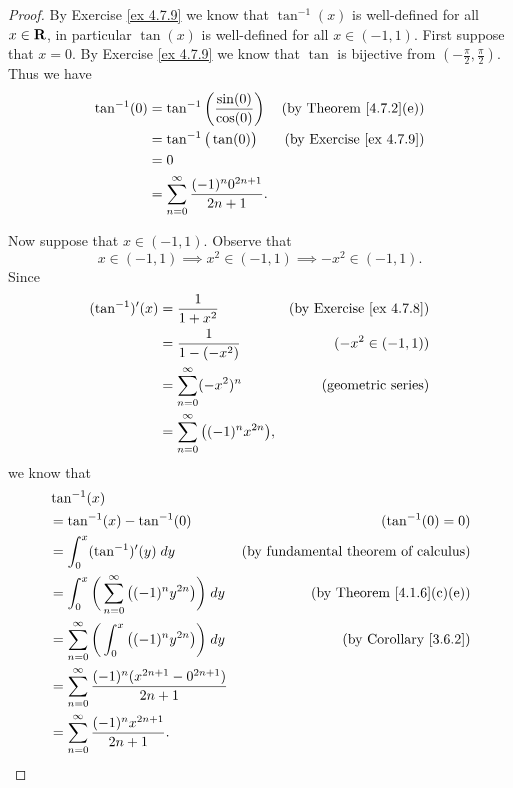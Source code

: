 \begin{proof}
    By Exercise \ref{ex 4.7.9} we know that \(\tan^{-1}(x)\) is well-defined for all \(x \in \mathbf{R}\), in particular \(\tan(x)\) is well-defined for all \(x \in (-1, 1)\).
    First suppose that \(x = 0\).
    By Exercise \ref{ex 4.7.9} we know that \(\tan\) is bijective from \((-\frac{\pi}{2}, \frac{\pi}{2})\).
    Thus we have
    \begin{align*}
        \tan^{-1}(0) & = \tan^{-1}\bigg(\frac{\sin(0)}{\cos(0)}\bigg)          & \text{(by Theorem \ref{4.7.2}(e))}  \\
                     & = \tan^{-1}\big(\tan(0)\big)                            & \text{(by Exercise \ref{ex 4.7.9})} \\
                     & = 0                                                                                           \\
                     & = \sum_{n = 0}^\infty \frac{(-1)^n 0^{2n + 1}}{2n + 1}.
    \end{align*}

    Now suppose that \(x \in (-1, 1)\).
    Observe that
    \[
        x \in (-1, 1) \implies x^2 \in (-1, 1) \implies -x^2 \in (-1, 1).
    \]
    Since
    \begin{align*}
        (\tan^{-1})'(x) & = \frac{1}{1 + x^2}                            & \text{(by Exercise \ref{ex 4.7.8})} \\
                        & = \frac{1}{1 - (-x^2)}                         & (-x^2 \in (-1, 1))                  \\
                        & = \sum_{n = 0}^\infty (-x^2)^n                 & \text{(geometric series)}           \\
                        & = \sum_{n = 0}^\infty \big((-1)^n x^{2n}\big),
    \end{align*}
    we know that
    \begin{align*}
         & \tan^{-1}(x)                                                                                                             \\
         & = \tan^{-1}(x) - \tan^{-1}(0)                                              & (\tan^{-1}(0) = 0)                          \\
         & = \int_0^x (\tan^{-1})'(y) \; dy                                           & \text{(by fundamental theorem of calculus)} \\
         & = \int_{0}^x \bigg(\sum_{n = 0}^\infty \big((-1)^n y^{2n}\big)\bigg) \; dy & \text{(by Theorem \ref{4.1.6}(c)(e))}       \\
         & = \sum_{n = 0}^\infty \bigg(\int_{0}^x \big((-1)^n y^{2n}\big)\bigg) \; dy & \text{(by Corollary \ref{3.6.2})}           \\
         & = \sum_{n = 0}^\infty \frac{(-1)^n (x^{2n + 1} - 0^{2n + 1})}{2n + 1}                                                    \\
         & = \sum_{n = 0}^\infty \frac{(-1)^n x^{2n + 1}}{2n + 1}.
    \end{align*}


\end{proof}
